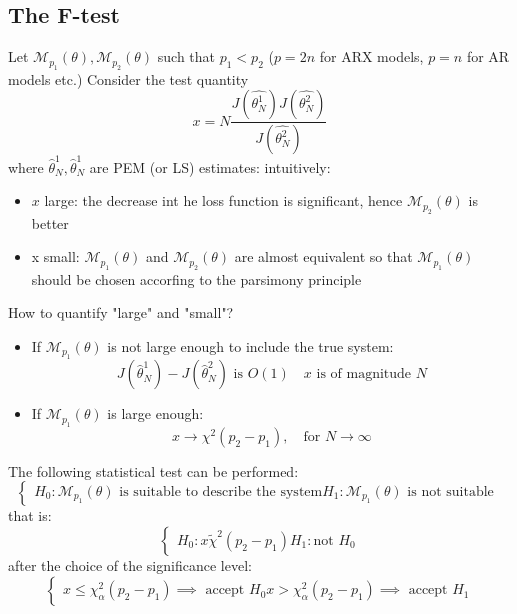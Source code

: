 \documentclass{book}
\begin{document}
\subsection{The F-test}
Let $\mathcal{M}_{p_1}(\theta),\mathcal{M}_{p_2}(\theta)$ such that $p_1<p_2$ ($p=2n$ for ARX models, $p=n$ for AR models etc.) Consider the test quantity
\[
    x=N\displaystyle\frac{J(\hat{\theta^1_N})J(\hat{\theta^2_N})}{J(\hat{\theta^2_N})}
\]
where $\hat{\theta}^1_N,\hat{\theta}^1_N$ are PEM (or LS) estimates: intuitively:
\begin{itemize}
    \item $x$ large: the decrease int he loss function is significant, hence $\mathcal{M}_{p_2}(\theta)$ is better
    \item x small: $\mathcal{M}_{p_1}(\theta)$ and $\mathcal{M}_{p_2}(\theta)$ are almost equivalent so that $\mathcal{M}_{p_1}(\theta)$ should be chosen accorfing to the parsimony principle
\end{itemize}
How to quantify "large" and "small"?
\begin{itemize}
    \item If $\mathcal{M}_{p_1}(\theta)$ is not large enough to include the true system: \[
            J(\hat{\theta}_N^1)-J(\hat{\theta}_N^2) \text{ is } O(1) \quad x\text{ is of magnitude } N
    \]
    \item If $\mathcal{M}_{p_1}(\theta)$ is large enough: \[
            x \to \chi^2(p_2-p_1), \quad \text{for } N\to\infty
    \]
\end{itemize}
The following statistical test can be performed:
\[
    \begin{cases}
        H_0:\mathcal{M}_{p_1}(\theta) \text{ is suitable to describe the system}
        H_1:\mathcal{M}_{p_1}(\theta) \text{ is not suitable }
    \end{cases}
\]
that is:
\[
    \begin{cases}
        H_0: x \tilde \chi^2(p_2-p_1)
        H_1: \text{not }H_0
    \end{cases}
\]
after the choice of the significance level:
\[
    \begin{cases}
        x\leq \chi^2_\alpha(p_2-p_1) \implies \text{ accept }H_0
        x>\chi^2_\alpha(p_2-p_1) \implies \text{ accept }H_1
    \end{cases}
\]
\end{document}
